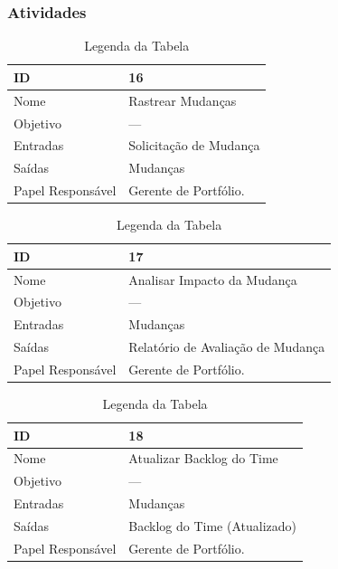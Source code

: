 \subsubsection{Atividades}

\begin{table}[H]
  \centering
    \begin{tabular}{| m{5em} | m{10cm} |}
      \hline
      ID       & 16   \\ \hline
      Nome     & Rastrear Mudanças  \\ \hline
      Objetivo & ---  \\ \hline
      Entradas & Solicitação de Mudança\\ \hline
      Saídas   & Mudanças \\ \hline
      Papel Responsável   & Gerente de Portfólio. \\ \hline
    \end{tabular}
    \caption{Legenda da Tabela}
    \label{tabela:atividade16}
\end{table}

\begin{table}[H]
  \centering
    \begin{tabular}{| m{5em} | m{10cm} |}
      \hline
      ID       & 17   \\ \hline
      Nome     & Analisar Impacto da Mudança \\ \hline
      Objetivo & ---  \\ \hline
      Entradas & Mudanças \\ \hline
      Saídas   & Relatório de Avaliação de Mudança \\ \hline
      Papel Responsável   & Gerente de Portfólio. \\ \hline
    \end{tabular}
    \caption{Legenda da Tabela}
    \label{tabela:atividade17}
\end{table}

\begin{table}[H]
  \centering
    \begin{tabular}{| m{5em} | m{10cm} |}
      \hline
      ID       & 18   \\ \hline
      Nome     & Atualizar Backlog do Time  \\ \hline
      Objetivo & ---  \\ \hline
      Entradas & Mudanças \\ \hline
      Saídas   & Backlog do Time (Atualizado) \\ \hline
      Papel Responsável   & Gerente de Portfólio. \\ \hline
    \end{tabular}
    \caption{Legenda da Tabela}
    \label{tabela:atividade18}
\end{table}

